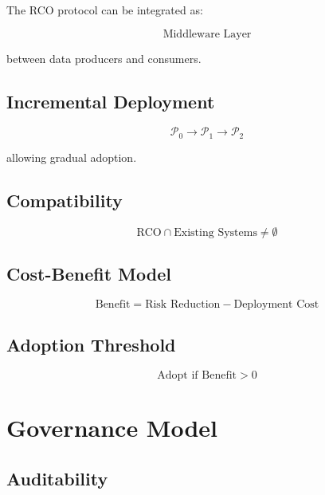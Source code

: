 The RCO protocol can be integrated as:

\begin{equation}
\text{Middleware Layer}
\end{equation}

between data producers and consumers.

\subsection{Incremental Deployment}

\begin{equation}
\mathcal{P}_0 \rightarrow \mathcal{P}_1 \rightarrow \mathcal{P}_2
\end{equation}

allowing gradual adoption.

\subsection{Compatibility}

\begin{equation}
\text{RCO} \cap \text{Existing Systems} \neq \emptyset
\end{equation}

\subsection{Cost-Benefit Model}

\begin{equation}
\text{Benefit} = \text{Risk Reduction} - \text{Deployment Cost}
\end{equation}

\subsection{Adoption Threshold}

\begin{equation}
\text{Adopt if } \text{Benefit} > 0
\end{equation}

\section{Governance Model}

\subsection{Auditability}

